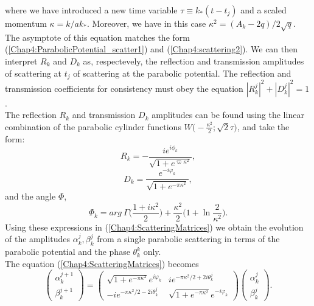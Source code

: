 \documentclass[11pt,a4paper,twoside]{book}
\begin{document}
where we have introduced a new time variable $ \tau \equiv k_{*}(t-t_{j}) $ and a scaled momentum $ \kappa = k/ak_{*} $. Moreover, we have in this case $ \kappa^{2} = (A_{k}-2q)/2\sqrt{q} $. The asymptote of this equation matches the form (\ref{Chap4:ParabolicPotential_scatter1}) and (\ref{Chap4:scattering2}). We can then interpret $ R_{k} $ and $ D_{k} $ as, respectevely, the reflection and transmission amplitudes of scattering at $ t_{j} $ of scattering at the parabolic potential. The reflection and transmission coefficients for consistency must obey the equation $ |R_{k}^{j}|^{2}  +  |D_{k}^{j}|^{2} = 1$.\\
The reflection $ R_{k} $ and transmission  $ D_{k} $ amplitudes can be found using  the linear combination of the parabolic cylinder functions $ W\Bigg(-\frac{\kappa^{2}}{2};\sqrt{2}\tau\Bigg) $, and take the form:
\begin{equation}
R_{k}=-\frac{ie^{i\phi_{k}}}{\sqrt{1+e^{\varpi \kappa^{2}}}},
\end{equation}
\begin{equation}
	D_{k} = \frac{e^{-i\varphi_{k}}}{\sqrt{1+e^{-\pi \kappa^{2}}}},
\end{equation}
and the angle $ \varPhi $,
\begin{equation}
\label{Chap4:angleParabolicPotential}
\varPhi_{k}=arg\ \Gamma\Bigg(\frac{1+i\kappa^{2}}{2}\Bigg) + \frac{\kappa^{2}}{2}\Bigg(1+\ln \frac{2}{\kappa^{2}}\Bigg).
\end{equation}
Using these expressions in (\ref{Chap4:ScatteringMatrices}) we obtain the evolution of the amplitudes $ \alpha^{j}_{k},\beta_{k}^{j} $ from a single parabolic scattering in terms of the parabolic potential and the phase $ \theta_{k}^{k} $ only.\\
The equation (\ref{Chap4:ScatteringMatrices}) becomes
\begin{equation}
	\label{Chap4:scatteringMatrix2}
		\left(
	\begin{array}{c}
		\alpha_{k}^{j+1} \\
		\beta_{k}^{j+1}
	\end{array}
	\right)
	=
	\left(
	\begin{array}{cc}
		\sqrt{1+e^{-\pi \kappa^{2}}}e^{i\varphi_{k}}  & ie^{-\pi \kappa^{2}/2 + 2i\theta^{j}_{k}} \\
		-ie^{-\pi \kappa^{2}/2 - 2i\theta^{j}_{k}} & \sqrt{1+e^{-\pi \kappa^{2}}} e^{-i\varphi_{k}}
	\end{array}
	\right)
	\left(
	\begin{array}{c}
		\alpha_{k}^{j}	\\
		\beta_{k}^{j}
	\end{array}
	\right).
\end{equation}
\end{document}

